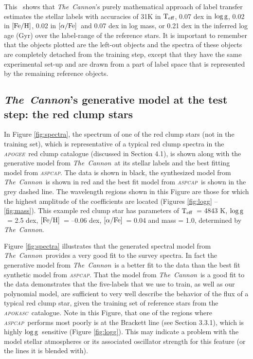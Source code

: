 \documentclass[12pt, preprint]{aastex}
\newcommand{\project}[1]{\textsl{#1}}
\newcommand{\tc}{\project{The~Cannon}}
\newcommand{\apogee}{\project{\textsc{apogee}}}
\newcommand{\apokasc}{\project{\textsc{apokasc}}}
\newcommand{\aspcap}{\project{\textsc{aspcap}}}
\newcommand{\teff}{\mbox{$\rm T_{eff}$}}
\newcommand{\feh}{\mbox{$\rm [Fe/H]$}}
\newcommand{\alphafe}{\mbox{$\rm [\alpha/Fe]$}}
\newcommand{\logg}{\mbox{$\rm \log g$}}
\begin{document}
This \figurename\ shows that \tc 's purely mathematical approach of label transfer estimates the stellar labels with accuracies of 31K in \teff, 0.07 dex in \logg, 0.02 in \feh, 0.02 in \alphafe\ and  0.07 dex in log mass, or 0.21 dex in the inferred log age (Gyr) over the label-range of the reference stars. It is important to remember that the objects plotted are the left-out objects and the spectra of these objects are completely detached from the training step,  except that they have the same experimental set-up and are drawn from a part of label space that is represented by the remaining reference objects.


\subsection{\tc's generative model at the test step: the red clump stars}


In Figure \ref{fig:spectra}, the spectrum of one of the red clump stars (not in the training set), which is representative of a typical red clump spectra in the \apogee\ red clump catalogue (discussed in Section 4.1), is shown along with the generative model from \tc\ at its stellar labels and the best fitting model from \aspcap. The data is shown in black, the synthesized model from \tc\ is shown in red and the best fit model from \aspcap\ is shown in the grey dashed line. The wavelength regions shown in this Figure are those for which the highest amplitude of the coefficients are located (Figures \ref{fig:logg} -- \ref{fig:mass}).  This example red clump star has parameters of \teff\ = 4843 K, \logg\ = 2.5 dex, \feh\ = --0.06 dex, \alphafe\ = 0.04 and mass = 1.0, determined by \tc. 


Figure \ref{fig:spectra} illustrates that the generated spectral model from \tc\ provides a very good fit to the survey spectra. In fact the generative model from \tc\ is a better fit to the data than the best fit synthetic model from \aspcap. That the model from \tc\ is a good fit to the data demonstrates that the five-labels that we use to train, as well as our polynomial model, are sufficient to very well describe the behavior of the flux of a typical red clump star, given the training set of reference stars from the \apokasc\ catalogue. Note in this Figure, that one of the regions where \aspcap\ performs most poorly is at the Brackett line (see Section 3.3.1), which is highly \logg\ sensitive (Figure \ref{fig:logg}). This may indicate a problem with the model stellar atmospheres or its associated oscillator strength for this feature (or the lines it is blended with). 
\end{document}

